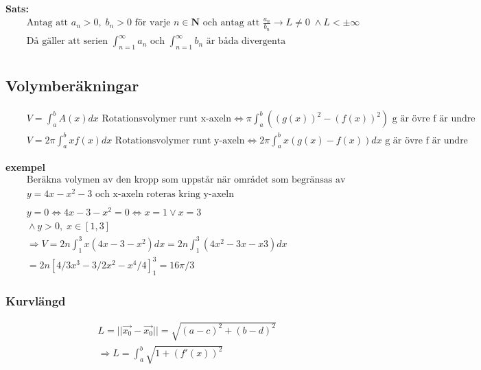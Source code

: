 \documentclass{article}
\begin{document}
\textbf{Sats: }
\begin{align*}
  &\quad  \text{Antag att } a_n >0, \; b_n >0 \text{ för varje } n \in \mathbf{N} \text{ och antag att } 
  \frac{a_n}{b_n}\to L \neq 0 \; \land L < \pm\infty\\
  &\quad  \text{Då gäller att serien } \int_{n=1}^{\infty}a_n \text{ och }
  \int_{n=1}^{\infty}b_n \text{ är båda divergenta} \\
\end{align*}



\newpage


\subsection{Volymberäkningar}
\begin{align*}
  &\quad  V = \int_a^b A(x)dx \text{ Rotationsvolymer runt x-axeln}
  \Leftrightarrow \pi \int_a^b ({(g(x))}^2 - {(f(x))}^2) \text{ g är övre f är undre} \\
  &\quad  V = 2\pi \int_a^b xf(x)dx \text{ Rotationsvolymer runt y-axeln}
  \Leftrightarrow 2\pi \int_a^b x(g(x)-f(x))dx \text{ g är övre f är undre}
\end{align*}

\textbf{exempel}
\begin{align*}
  &\quad  \text{Beräkna volymen av den kropp som uppstår när området som begränsas av kurnvan }  \\
  &\quad  y=4x-x^2-3 \text{ och x-axeln roteras kring y-axeln} \\
  &\quad  \\
  &\quad  y=0 \Leftrightarrow 4x-3-x^2=0 \Leftrightarrow x=1 \lor x=3 \\
  &\quad  \land y>0, \; x\in[1,3] \\
  &\quad  \Rightarrow V = 2n\int_1^3 x(4x-3-x^2)dx = 2n \int_1^3(4x^2-3x-x3)dx \\
  &\quad  = 2n[4/3x^3-3/2x^2-x^4/4]_1^3 = 16\pi/3
\end{align*}


\subsubsection{Kurvlängd}
\begin{align*}
  &\quad  L=||\vec{x_0} -\vec{x_0}|| = \sqrt{{(a-c)}^2 + {(b-d)}^2} \\
  &\quad  \Rightarrow L= \int_a^b \sqrt{1+{(f'(x))}^2} \\
\end{align*}
\end{document}
